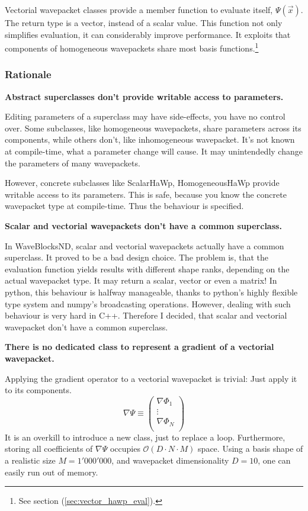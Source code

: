 \documentclass{article}
\begin{document}
Vectorial wavepacket classes provide a member function to evaluate itself, \(\Psi(\vec{x})\).
The return type is a vector, instead of a scalar value.
This function not only simplifies evaluation, it can considerably improve performance.
It exploits that components of homogeneous wavepackets share most basis
functions.\footnote{See section (\ref{sec:vector_hawp_eval}).}

\subsubsection{Rationale}

\textbf{Abstract superclasses don't provide writable access to parameters.}\par
Editing parameters of a superclass may have side-effects, you have no control over.
Some subclasses, like homogeneous wavepackets, share parameters across its components, while
others don't, like inhomogeneous wavepacket. It's not known at compile-time, what a
parameter change will cause. It may unintendedly change the parameters of many wavepackets.

However, concrete subclasses like ScalarHaWp, HomogeneousHaWp provide writable
access to its parameters. This is safe, because you know the concrete wavepacket type at compile-time.
Thus the behaviour is specified.
\par\bigskip
\textbf{Scalar and vectorial wavepackets don't have a common superclass.}\par
In WaveBlocksND, scalar and vectorial wavepackets actually have a common superclass.
It proved to be a bad design choice.
The problem is, that the evaluation function yields results
with different shape ranks, depending on the actual wavepacket type. It may
return a scalar, vector or even a matrix!
In python, this behaviour is halfway manageable, thanks to python's highly flexible type system
and numpy's broadcasting operations.
However, dealing with such behaviour is very hard in C++.
Therefore I decided, that scalar and vectorial wavepacket don't have a common superclass.
\par\bigskip
\textbf{There is no dedicated class to represent a gradient of a vectorial wavepacket.}\par
Applying the gradient operator to a vectorial wavepacket is trivial: Just apply it
to its components.
\[\nabla \Psi \equiv
\begin{pmatrix}
  \nabla \Phi_1 \\
  \vdots \\
  \nabla \Phi_N \\
\end{pmatrix}
\]
It is an overkill to introduce a new class, just to replace a loop.
Furthermore, storing all coefficients of \(\nabla\Psi\) occupies \(\mathcal{O}(D \cdot N \cdot M)\) space.
Using a basis shape of a realistic size \(M=1'000'000\), and wavepacket
dimensionality \(D=10\), one can easily run out of memory.
\end{document}
